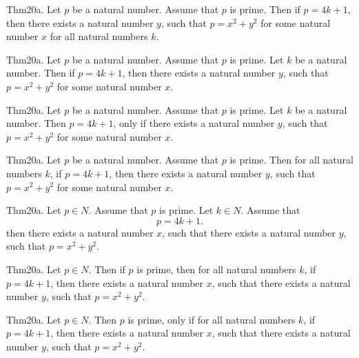 \documentclass{article}
\begin{document}
Thm20a. Let $p$ be a natural number. Assume that $p$ is prime. Then if $p = 4 k + 1$, then there exists a natural number $y$, such that $p = x ^{ 2}+ y ^{ 2}$ for some natural number $x$ for all natural numbers $k$.

Thm20a. Let $p$ be a natural number. Assume that $p$ is prime. Let $k$ be a natural number. Then if $p = 4 k + 1$, then there exists a natural number $y$, such that $p = x ^{ 2}+ y ^{ 2}$ for some natural number $x$.

Thm20a. Let $p$ be a natural number. Assume that $p$ is prime. Let $k$ be a natural number. Then $p = 4 k + 1$, only if there exists a natural number $y$, such that $p = x ^{ 2}+ y ^{ 2}$ for some natural number $x$.

Thm20a. Let $p$ be a natural number. Assume that $p$ is prime. Then for all natural numbers $k$, if $p = 4 k + 1$, then there exists a natural number $y$, such that $p = x ^{ 2}+ y ^{ 2}$ for some natural number $x$.

Thm20a. Let $p \in N$. Assume that $p$ is prime. Let $k \in N$. Assume that $$p = 4 k + 1.$$ then there exists a natural number $x$, such that there exists a natural number $y$, such that $p = x ^{ 2}+ y ^{ 2}$.

Thm20a. Let $p \in N$. Then if $p$ is prime, then for all natural numbers $k$, if $p = 4 k + 1$, then there exists a natural number $x$, such that there exists a natural number $y$, such that $p = x ^{ 2}+ y ^{ 2}$.

Thm20a. Let $p \in N$. Then $p$ is prime, only if for all natural numbers $k$, if $p = 4 k + 1$, then there exists a natural number $x$, such that there exists a natural number $y$, such that $p = x ^{ 2}+ y ^{ 2}$.
\end{document}
